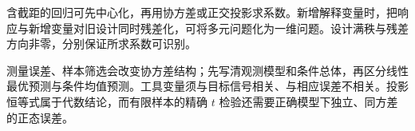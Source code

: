 含截距的回归可先中心化，再用协方差或正交投影求系数。新增解释变量时，把响应与新增变量对旧设计同时残差化，可将多元问题化为一维问题。设计满秩与残差方向非零，分别保证所求系数可识别。

测量误差、样本筛选会改变协方差结构；先写清观测模型和条件总体，再区分线性最优预测与条件均值预测。工具变量须与目标信号相关、与相应误差不相关。投影恒等式属于代数结论，而有限样本的精确 $t$ 检验还需要正确模型下独立、同方差的正态误差。
\par\smallskip
